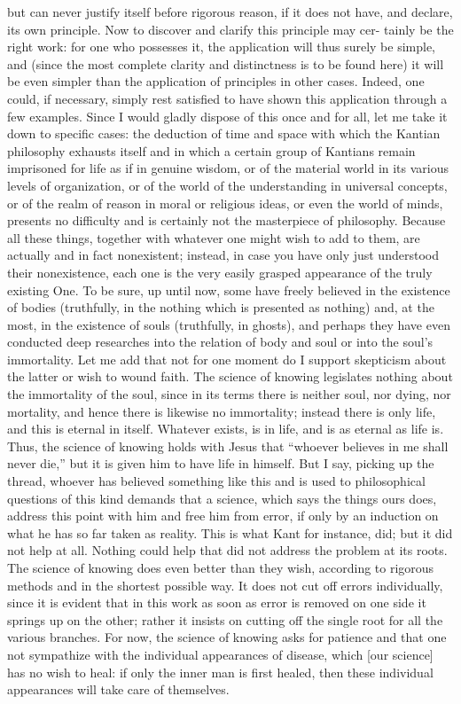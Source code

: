 but can never justify itself before rigorous reason,
if it does not have, and declare, its own principle.
Now to discover and clarify this principle may cer-
tainly be the right work:
for one who possesses it,
the application will thus surely be simple,
and (since the most complete clarity and distinctness is
to be found here)
it will be even simpler than the application
of principles in other cases.
Indeed, one could, if necessary,
simply rest satisfied to have shown
this application through a few examples.
Since I would gladly dispose of this once and for all,
let me take it down to specific cases:
the deduction of time and space
with which the Kantian philosophy exhausts itself
and in which a certain group of Kantians remain
imprisoned for life as if in genuine wisdom,
or of the material world in its various levels of organization,
or of the world of the understanding in universal concepts,
or of the realm of reason in moral or religious ideas,
or even the world of minds,
presents no difficulty and is certainly
not the masterpiece of philosophy.
Because all these things,
together with whatever one might wish to add to them,
are actually and in fact nonexistent;
instead, in case you have only just understood their nonexistence,
each one is the very easily grasped appearance
of the truly existing One.
To be sure, up until now,
some have freely believed in the existence of bodies
(truthfully, in the nothing which is presented as nothing)
and, at the most, in the existence of souls
(truthfully, in ghosts),
and perhaps they have even conducted
deep researches into the relation of body and soul
or into the soul's immortality.
Let me add that not for one moment do I support
skepticism about the latter or wish to wound faith.
The science of knowing legislates
nothing about the immortality of the soul,
since in its terms there is
neither soul, nor dying, nor mortality,
and hence there is likewise no immortality;
instead there is only life,
and this is eternal in itself.
Whatever exists, is in life,
and is as eternal as life is.
Thus, the science of knowing holds with Jesus that
“whoever believes in me shall never die,”
but it is given him to have life in himself.
But I say, picking up the thread,
whoever has believed something like this
and is used to philosophical questions of this kind
demands that a science, which says the things ours does,
address this point with him and free him from error,
if only by an induction on what he has so far taken as reality.
This is what Kant for instance, did;
but it did not help at all.
Nothing could help that did not address the problem at its roots.
The science of knowing does even better than they wish,
according to rigorous methods and in the shortest possible way.
It does not cut off errors individually,
since it is evident that in this work
as soon as error is removed on one side
it springs up on the other;
rather it insists on cutting off
the single root for all the various branches.
For now, the science of knowing asks for patience
and that one not sympathize with
the individual appearances of disease,
which [our science] has no wish to heal:
if only the inner man is first healed,
then these individual appearances
will take care of themselves.

